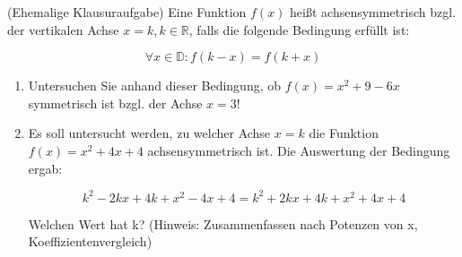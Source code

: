 \item (Ehemalige Klausuraufgabe) Eine Funktion $f(x)$ heißt achsensymmetrisch bzgl. der vertikalen Achse $x=k, k\in\mathbb{R}$, falls die folgende Bedingung erfüllt ist:

$$\forall x \in \mathbb{D}: f(k-x) = f(k+x)$$

\begin{enumerate}

\item Untersuchen Sie anhand dieser Bedingung, ob $f(x) = x^2+9-6x$ symmetrisch ist bzgl. der Achse $x=3$!

\item Es soll untersucht werden, zu welcher Achse $x=k$ die Funktion $f(x) = x^2+4x+4$ achsensymmetrisch ist. Die Auswertung der Bedingung ergab:

$$k^2-2kx+4k+x^2-4x+4 = k^2 + 2kx + 4k + x^2 + 4x +4$$

Welchen Wert hat k? (Hinweis: Zusammenfassen nach Potenzen von x, Koeffizientenvergleich)

\end{enumerate}

